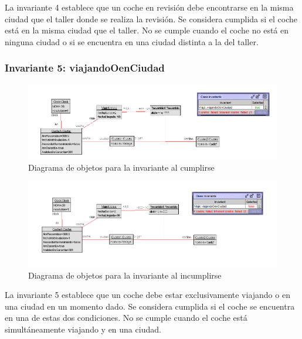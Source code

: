 \documentclass[12pt.a4paper]{article}
\begin{document}
La invariante 4 establece que un coche en revisión debe encontrarse en la misma ciudad que el taller donde se realiza la revisión. Se considera cumplida si el coche está en la misma ciudad que el taller. No se cumple cuando el coche no está en ninguna ciudad o si se encuentra en una ciudad distinta a la del taller.

\subsubsection{Invariante 5: viajandoOenCiudad}

\vspace{1.0 cm}
\begin{figure}[H]
     \includegraphics[width=1\linewidth]{Soils/5.png}
     \caption{Diagrama de objetos para la invariante al cumplirse}
     \label{Diagrama del sistema de aviacion}
\end{figure}

\begin{figure}[H]
     \includegraphics[width=1\linewidth]{Soils/5_v2.png}
     \caption{Diagrama de objetos para la invariante al incumplirse}
     \label{Diagrama del sistema de aviacion}
\end{figure}

La invariante 5 establece que un coche debe estar exclusivamente viajando o en una ciudad en un momento dado. Se considera cumplida si el coche se encuentra en una de estas dos condiciones. No se cumple cuando el coche está simultáneamente viajando y en una ciudad.
\end{document}
